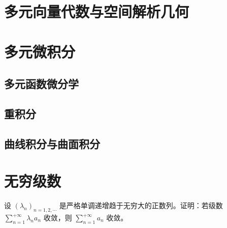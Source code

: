 \documentclass[12pt]{article}
\newenvironment{problem}[2][Problem]{\begin{trivlist}
\item[\hskip \labelsep {\bfseries #1}\hskip \labelsep {\bfseries #2.}]}{\end{trivlist}}
\begin{document}
\section{多元向量代数与空间解析几何}


\section{多元微积分}

\subsection{多元函数微分学}


\subsection{重积分}


\subsection{曲线积分与曲面积分}


\section{无穷级数}

\begin{problem}{1}
设 $(\lambda_n)_{n=1,2,\cdots}$ 是严格单调递增趋于无穷大的正数列。证明：若级数 $\displaystyle{ \sum_{n=1}^{+\infty}}\lambda_n a_n$ 收敛，则 $\displaystyle{\sum_{n=1}^{+\infty}}a_n$ 收敛。
\end{problem}
\end{document}
